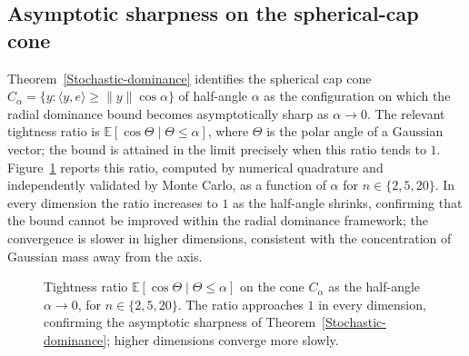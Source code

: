 \documentclass[11pt]{article}
\newcommand{\1}{\mathds{1}}
\theoremstyle{definition}
\theoremstyle{remark}
\theoremstyle{definition}
\begin{document}
\subsection{Asymptotic sharpness on the spherical-cap cone}
Theorem~\ref{Stochastic-dominance} identifies the spherical cap cone $C_\alpha=\{y:\langle y,e\rangle\ge\|y\|\cos\alpha\}$ of half-angle $\alpha$ as the configuration on which the radial dominance bound becomes asymptotically sharp as $\alpha\to0$. The relevant tightness ratio is $\mathbb{E}[\cos\Theta\mid\Theta\le\alpha]$, where $\Theta$ is the polar angle of a Gaussian vector; the bound is attained in the limit precisely when this ratio tends to $1$. Figure~\ref{fig:sharpness} reports this ratio, computed by numerical quadrature and independently validated by Monte Carlo, as a function of $\alpha$ for $n\in\{2,5,20\}$. In every dimension the ratio increases to $1$ as the half-angle shrinks, confirming that the bound cannot be improved within the radial dominance framework; the convergence is slower in higher dimensions, consistent with the concentration of Gaussian mass away from the axis.
\begin{figure}[htbp]
\centering
{}
\caption{Tightness ratio $\mathbb{E}[\cos\Theta\mid\Theta\le\alpha]$ on the cone $C_\alpha$ as the half-angle $\alpha\to0$, for $n\in\{2,5,20\}$. The ratio approaches $1$ in every dimension, confirming the asymptotic sharpness of Theorem~\ref{Stochastic-dominance}; higher dimensions converge more slowly.}
\label{fig:sharpness}
\end{figure}
\end{document}
